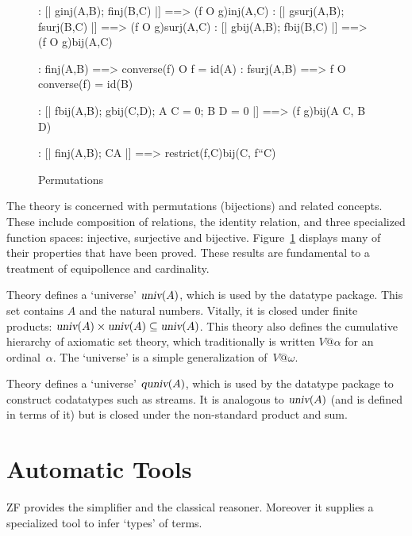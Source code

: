 \begin{figure}
\begin{alltt*}
:      [| g\isasymin{}inj(A,B);  f\isasymin{}inj(B,C)  |] ==> (f O g)\isasymin{}inj(A,C)
:     [| g\isasymin{}surj(A,B); f\isasymin{}surj(B,C) |] ==> (f O g)\isasymin{}surj(A,C)
:      [| g\isasymin{}bij(A,B); f\isasymin{}bij(B,C) |] ==> (f O g)\isasymin{}bij(A,C)

:    f\isasymin{}inj(A,B) ==> converse(f) O f = id(A)
:   f\isasymin{}surj(A,B) ==> f O converse(f) = id(B)

:  
    [| f\isasymin{}bij(A,B);  g\isasymin{}bij(C,D);  A \isasyminter C = 0;  B \isasyminter D = 0 |] ==> 
    (f \isasymunion g)\isasymin{}bij(A \isasymunion C, B \isasymunion D)

: [| f\isasymin{}inj(A,B); C\isasymsubseteq{}A |] ==> restrict(f,C)\isasymin{}bij(C, f``C)
\end{alltt*}
\caption{Permutations} \label{zf-perm}
\end{figure}

The theory  is concerned with permutations (bijections) and
related concepts.  These include composition of relations, the identity
relation, and three specialized function spaces: injective, surjective and
bijective.  Figure~\ref{zf-perm} displays many of their properties that
have been proved.  These results are fundamental to a treatment of
equipollence and cardinality.

Theory  defines a `universe' $\emph{\sl univ}(A)$, which is used by
the datatype package.  This set contains $A$ and the
natural numbers.  Vitally, it is closed under finite products: 
$\emph{\sl univ}(A)\times\emph{\sl univ}(A)\subseteq\emph{\sl univ}(A)$.  This theory also
defines the cumulative hierarchy of axiomatic set theory, which
traditionally is written $V@\alpha$ for an ordinal~$\alpha$.  The
`universe' is a simple generalization of~$V@\omega$.

Theory  defines a `universe' $\emph{\sl quniv}(A)$, which is used by
the datatype package to construct codatatypes such as streams.  It is
analogous to $\emph{\sl univ}(A)$ (and is defined in terms of it) but is closed
under the non-standard product and sum.


\section{Automatic Tools}

ZF provides the simplifier and the classical reasoner.  Moreover it supplies a
specialized tool to infer `types' of terms.

